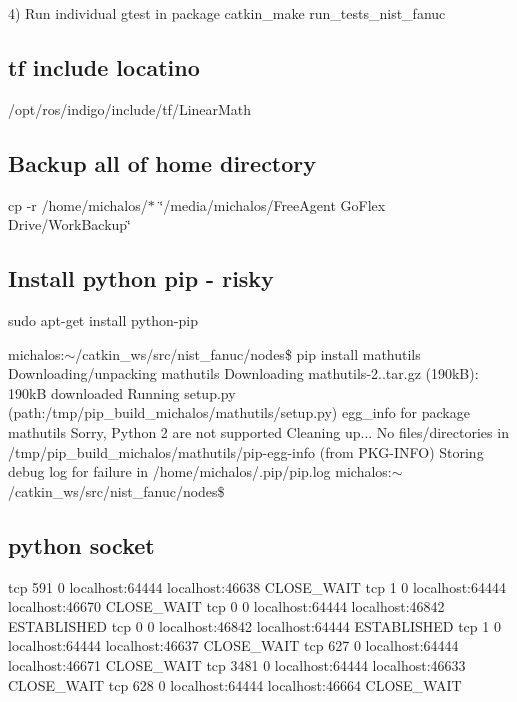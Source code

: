 4) Run individual gtest in package catkin\-\_\-make run\-\_\-tests\-\_\-nist\-\_\-fanuc

\subsection*{tf include locatino }

/opt/ros/indigo/include/tf/\-Linear\-Math

\subsection*{Backup all of home directory }

cp -\/r /home/michalos/$\ast$ \char`\"{}/media/michalos/\-Free\-Agent Go\-Flex Drive/\-Work\-Backup\char`\"{}

\subsection*{Install python pip -\/ risky }

sudo apt-\/get install python-\/pip

michalos\-:$\sim$/catkin\-\_\-ws/src/nist\-\_\-fanuc/nodes\$ pip install mathutils Downloading/unpacking mathutils Downloading mathutils-\/2..\-tar.\-gz (190k\-B)\-: 190k\-B downloaded Running setup.\-py (path\-:/tmp/pip\-\_\-build\-\_\-michalos/mathutils/setup.py) egg\-\_\-info for package mathutils Sorry, Python 2 are not supported Cleaning up... No files/directories in /tmp/pip\-\_\-build\-\_\-michalos/mathutils/pip-\/egg-\/info (from P\-K\-G-\/\-I\-N\-F\-O) Storing debug log for failure in /home/michalos/.pip/pip.\-log michalos\-:$\sim$/catkin\-\_\-ws/src/nist\-\_\-fanuc/nodes\$

\subsection*{python socket }

tcp 591 0 localhost\-:64444 localhost\-:46638 C\-L\-O\-S\-E\-\_\-\-W\-A\-I\-T tcp 1 0 localhost\-:64444 localhost\-:46670 C\-L\-O\-S\-E\-\_\-\-W\-A\-I\-T tcp 0 0 localhost\-:64444 localhost\-:46842 E\-S\-T\-A\-B\-L\-I\-S\-H\-E\-D tcp 0 0 localhost\-:46842 localhost\-:64444 E\-S\-T\-A\-B\-L\-I\-S\-H\-E\-D tcp 1 0 localhost\-:64444 localhost\-:46637 C\-L\-O\-S\-E\-\_\-\-W\-A\-I\-T tcp 627 0 localhost\-:64444 localhost\-:46671 C\-L\-O\-S\-E\-\_\-\-W\-A\-I\-T tcp 3481 0 localhost\-:64444 localhost\-:46633 C\-L\-O\-S\-E\-\_\-\-W\-A\-I\-T tcp 628 0 localhost\-:64444 localhost\-:46664 C\-L\-O\-S\-E\-\_\-\-W\-A\-I\-T

